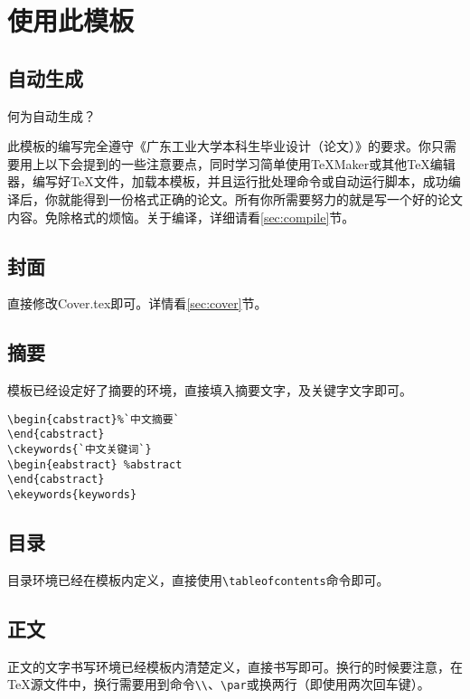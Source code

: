 \chapter{使用此模板}

\section{自动生成}
何为自动生成？

此模板的编写完全遵守《广东工业大学本科生毕业设计（论文）》的要求。你只需要用上以下会提到的一些注意要点，同时学习简单使用\TeX{}Maker或其他\TeX{}编辑器，编写好\TeX{}文件，加载本模板，并且运行批处理命令或自动运行脚本，成功编译后，你就能得到一份格式正确的论文。所有你所需要努力的就是写一个好的论文内容。免除格式的烦恼。关于编译，详细请看\ref{sec:compile}节。

\section{封面}
直接修改Cover.tex即可。详情看\ref{sec:cover}节。

\section{摘要}
模板已经设定好了摘要的环境，直接填入摘要文字，及关键字文字即可。
\begin{lstlisting}
\begin{cabstract}%`中文摘要`
\end{cabstract}
\ckeywords{`中文关键词`}
\begin{eabstract} %abstract
\end{cabstract}
\ekeywords{keywords}
\end{lstlisting}

\section{目录}
目录环境已经在模板内定义，直接使用\verb|\tableofcontents|命令即可。

\section{正文}
正文的文字书写环境已经模板内清楚定义，直接书写即可。换行的时候要注意，在\TeX{}源文件中，换行需要用到命令\verb|\\|、\verb|\par|或换两行（即使用两次回车键）。


